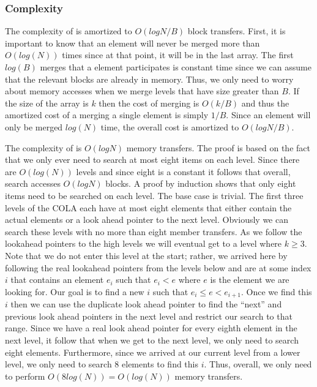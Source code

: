 \documentclass{style}
\begin{document}
\subsubsection{Complexity}

The complexity of \Insert is amortized to $O(log N / B)$ block transfers.
First, it is important to know that an element will never be merged more than
$O(log(N))$ times since at that point, it will be in the last array. The first
$log(B)$ merges that a element participates is constant time since we can
assume that the relevant blocks are already in memory. Thus, we only need to
worry about memory accesses when we merge levels that have size greater than
$B$. If the size of the array is $k$ then the cost of merging is $O(k/B)$ and
thus the amortized cost of a merging a single element is simply $1/B$. Since
an element will only be merged $log(N)$ time, the overall cost is amortized to
$O(logN/B)$.

The complexity of \Search is $O(log N)$ memory transfers. The proof is based
on the fact that we only ever need to search at most eight items on each
level. Since there are $O(log(N))$ levels and since eight is a constant it
follows that overall, search accesses $O(log N)$ blocks. A proof by induction
shows that only eight items need to be searched on each level. The base case
is trivial. The first three levels of the COLA each have at most eight
elements that either contain the actual elements or a look ahead pointer to
the next level. Obviously we can search these levels with no more than eight
member transfers. As we follow the lookahead pointers to the high levels we
will eventual get to a level where $k \geq 3$. Note that we do not enter this
level at the start; rather, we arrived here by following the real lookahead
pointers from the levels below and are at some index $i$ that contains an
element $e_i$ such that $e_i < e$ where $e$ is the element we are looking for.
Our goal is to find a new $i$ such that $e_i \leq e < e_{i+1}$. Once we find
this $i$ then we can use the duplicate look ahead pointer to find the ``next''
and previous look ahead pointers in the next level and restrict our search to
that range. Since we have a real look ahead pointer for every eighth element
in the next level, it follow that when we get to the next level, we only need
to search eight elements. Furthermore, since we arrived at our current level
from a lower level, we only need to search $8$ elements to find this $i$.
Thus, overall, we only need to perform $O(8log(N)) = O(log(N))$ memory
transfers.
\end{document}
